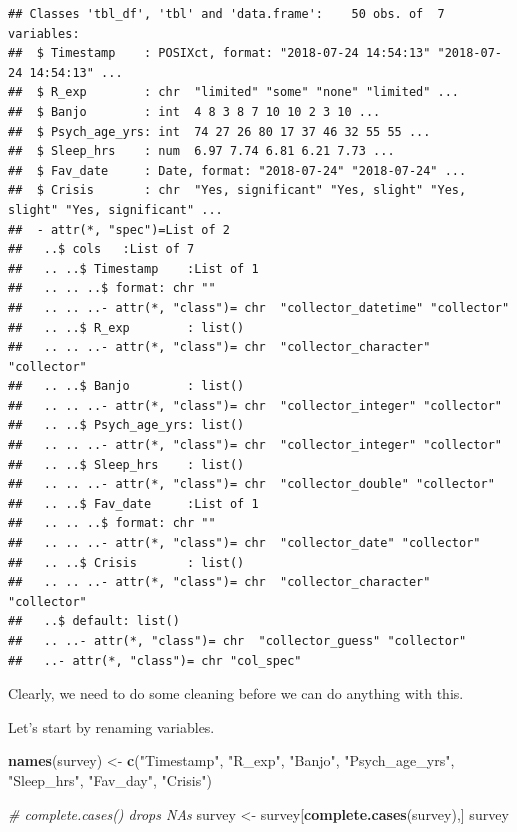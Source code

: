 \documentclass[]{article}
\newenvironment{Shaded}{\begin{snugshade}}{\end{snugshade}}
\newcommand{\KeywordTok}[1]{\textcolor[rgb]{0.13,0.29,0.53}{\textbf{#1}}}
\newcommand{\StringTok}[1]{\textcolor[rgb]{0.31,0.60,0.02}{#1}}
\newcommand{\CommentTok}[1]{\textcolor[rgb]{0.56,0.35,0.01}{\textit{#1}}}
\newcommand{\NormalTok}[1]{#1}
\begin{document}
\begin{verbatim}
## Classes 'tbl_df', 'tbl' and 'data.frame':    50 obs. of  7 variables:
##  $ Timestamp    : POSIXct, format: "2018-07-24 14:54:13" "2018-07-24 14:54:13" ...
##  $ R_exp        : chr  "limited" "some" "none" "limited" ...
##  $ Banjo        : int  4 8 3 8 7 10 10 2 3 10 ...
##  $ Psych_age_yrs: int  74 27 26 80 17 37 46 32 55 55 ...
##  $ Sleep_hrs    : num  6.97 7.74 6.81 6.21 7.73 ...
##  $ Fav_date     : Date, format: "2018-07-24" "2018-07-24" ...
##  $ Crisis       : chr  "Yes, significant" "Yes, slight" "Yes, slight" "Yes, significant" ...
##  - attr(*, "spec")=List of 2
##   ..$ cols   :List of 7
##   .. ..$ Timestamp    :List of 1
##   .. .. ..$ format: chr ""
##   .. .. ..- attr(*, "class")= chr  "collector_datetime" "collector"
##   .. ..$ R_exp        : list()
##   .. .. ..- attr(*, "class")= chr  "collector_character" "collector"
##   .. ..$ Banjo        : list()
##   .. .. ..- attr(*, "class")= chr  "collector_integer" "collector"
##   .. ..$ Psych_age_yrs: list()
##   .. .. ..- attr(*, "class")= chr  "collector_integer" "collector"
##   .. ..$ Sleep_hrs    : list()
##   .. .. ..- attr(*, "class")= chr  "collector_double" "collector"
##   .. ..$ Fav_date     :List of 1
##   .. .. ..$ format: chr ""
##   .. .. ..- attr(*, "class")= chr  "collector_date" "collector"
##   .. ..$ Crisis       : list()
##   .. .. ..- attr(*, "class")= chr  "collector_character" "collector"
##   ..$ default: list()
##   .. ..- attr(*, "class")= chr  "collector_guess" "collector"
##   ..- attr(*, "class")= chr "col_spec"
\end{verbatim}

Clearly, we need to do some cleaning before we can do anything with
this.

Let's start by renaming variables.

\begin{Shaded}
\begin{Highlighting}[]
\KeywordTok{names}\NormalTok{(survey) <-}\StringTok{ }\KeywordTok{c}\NormalTok{(}\StringTok{"Timestamp"}\NormalTok{,}
                  \StringTok{"R_exp"}\NormalTok{,}
                  \StringTok{"Banjo"}\NormalTok{,}
                  \StringTok{"Psych_age_yrs"}\NormalTok{,}
                  \StringTok{"Sleep_hrs"}\NormalTok{,}
                  \StringTok{"Fav_day"}\NormalTok{,}
                  \StringTok{"Crisis"}\NormalTok{)}
\end{Highlighting}
\end{Shaded}

\begin{Shaded}
\begin{Highlighting}[]
\CommentTok{# complete.cases() drops NAs}
\NormalTok{survey <-}\StringTok{ }\NormalTok{survey[}\KeywordTok{complete.cases}\NormalTok{(survey),]}
\NormalTok{survey}
\end{Highlighting}
\end{Shaded}
\end{document}

